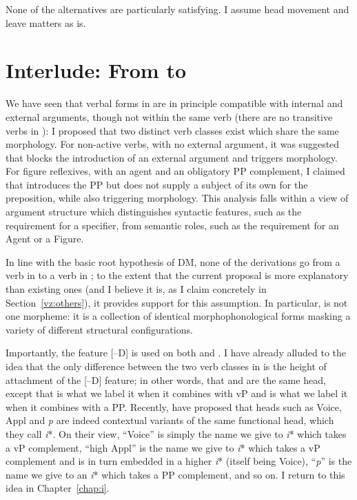 None of the alternatives are particularly satisfying. I assume head movement and leave matters as is.


\section{Interlude: From {\tnif} to {\thit}} \label{vz:interim}
We have seen that verbal forms in {\tnif} are in principle compatible with internal and external arguments, though not within the same verb (there are no transitive verbs in {\tnif}):
I proposed that two distinct verb classes exist which share the same morphology. For non-active verbs, with no external argument, it was suggested that {\vz} blocks the introduction of an external argument and triggers {\tnif} morphology. For figure reflexives, with an agent and an obligatory PP complement, I claimed that {\pz} introduces the PP but does not supply a subject of its own for the preposition, while also triggering {\tnif} morphology. This analysis falls within a view of argument structure which distinguishes syntactic features, such as the requirement for a specifier, from semantic roles, such as the requirement for an Agent or a Figure.

In line with the basic root hypothesis of DM, none of the derivations go from a verb in {\tkal} to a verb in {\tnif}; to the extent that the current proposal is more explanatory than existing ones (and I believe it is, as I claim concretely in Section~\ref{vz:others}), it provides support for this assumption. In particular, {\tnif} is not one morpheme: it is a collection of identical morphophonological forms masking a variety of different structural configurations.

Importantly, the feature [--D] is used on both {\vz} and {\pz}. I have already alluded to the idea that the only difference between the two verb classes in {\tnif} is the height of attachment of the [--D] feature; in other words, that {\vz} and {\pz} are the same head, except that {\vz} is what we label it when it combines with vP and {\pz} is what we label it when it combines with a PP. Recently, \cite{woodmarantz17} have proposed that heads such as Voice, Appl and \emph{p} are indeed contextual variants of the same functional head, which they call \emph{i}*. On their view, ``Voice'' is simply the name we give to \emph{i}* which takes a vP complement, ``high Appl'' is the name we give to \emph{i}* which takes a vP complement and is in turn embedded in a higher \emph{i}* (itself being Voice), ``\emph{p}'' is the name we give to an \emph{i}* which takes a PP complement, and so on. I return to this idea in Chapter~\ref{chap:i}.

